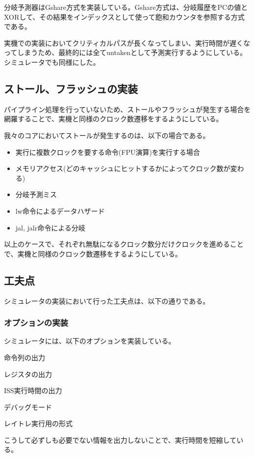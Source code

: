 \documentclass[a4paper,11pt]{ltjsarticle}
\begin{document}
分岐予測器はGshare方式を実装している。Gshare方式は、分岐履歴をPCの値とXORして、その結果をインデックスとして使って飽和カウンタを参照する方式である。

実機での実装においてクリティカルパスが長くなってしまい、実行時間が遅くなってしまうため、最終的には全てuntakenとして予測実行するようにしている。シミュレータでも同様にした。

\subsection*{ストール、フラッシュの実装}
パイプライン処理を行っていないため、ストールやフラッシュが発生する場合を網羅することで、実機と同様のクロック数遷移をするようにしている。

我々のコアにおいてストールが発生するのは、以下の場合である。

\begin{itemize}
  \item 実行に複数クロックを要する命令(FPU演算)を実行する場合
  \item メモリアクセス(どのキャッシュにヒットするかによってクロック数が変わる)
  \item 分岐予測ミス
  \item lw命令によるデータハザード
  \item jal, jalr命令による分岐
\end{itemize}

以上のケースで、それぞれ無駄になるクロック数分だけクロックを進めることで、実機と同様のクロック数遷移をするようにしている。

\subsection*{工夫点}
シミュレータの実装において行った工夫点は、以下の通りである。

\subsubsection*{オプションの実装}
シミュレータには、以下のオプションを実装している。

\begin{description}[labelwidth=5em]
  \item[-p] 命令列の出力
  \item[-r] レジスタの出力
  \item[-t] ISS実行時間の出力
  \item[-d] デバッグモード
  \item[-rt] レイトレ実行用の形式
\end{description}
こうして必ずしも必要でない情報を出力しないことで、実行時間を短縮している。
\end{document}
